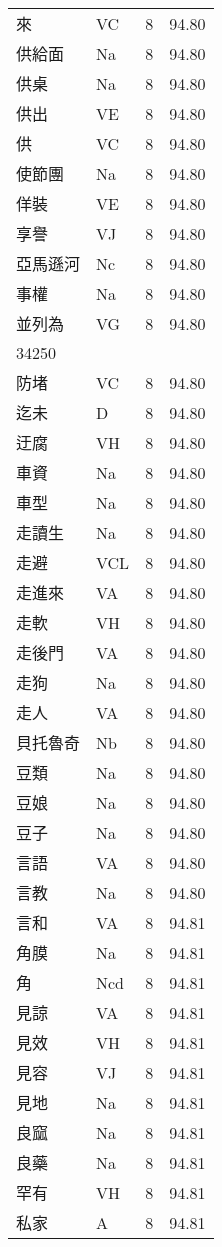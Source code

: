 \documentclass[twocolumn]{book}
\begin{document}
\begin{supertabular}{llrr}
來 & VC & 8 &  94.80\\
供給面 & Na & 8 &  94.80\\
供桌 & Na & 8 &  94.80\\
供出 & VE & 8 &  94.80\\
供 & VC & 8 &  94.80\\
使節團 & Na & 8 &  94.80\\
佯裝 & VE & 8 &  94.80\\
享譽 & VJ & 8 &  94.80\\
亞馬遜河 & Nc & 8 &  94.80\\
事權 & Na & 8 &  94.80\\
並列為 & VG & 8 &  94.80\\
34250\\
防堵 & VC & 8 &  94.80\\
迄未 & D & 8 &  94.80\\
迂腐 & VH & 8 &  94.80\\
車資 & Na & 8 &  94.80\\
車型 & Na & 8 &  94.80\\
走讀生 & Na & 8 &  94.80\\
走避 & VCL & 8 &  94.80\\
走進來 & VA & 8 &  94.80\\
走軟 & VH & 8 &  94.80\\
走後門 & VA & 8 &  94.80\\
走狗 & Na & 8 &  94.80\\
走人 & VA & 8 &  94.80\\
貝托魯奇 & Nb & 8 &  94.80\\
豆類 & Na & 8 &  94.80\\
豆娘 & Na & 8 &  94.80\\
豆子 & Na & 8 &  94.80\\
言語 & VA & 8 &  94.80\\
言教 & Na & 8 &  94.80\\
言和 & VA & 8 &  94.81\\
角膜 & Na & 8 &  94.81\\
角 & Ncd & 8 &  94.81\\
見諒 & VA & 8 &  94.81\\
見效 & VH & 8 &  94.81\\
見容 & VJ & 8 &  94.81\\
見地 & Na & 8 &  94.81\\
良窳 & Na & 8 &  94.81\\
良藥 & Na & 8 &  94.81\\
罕有 & VH & 8 &  94.81\\
私家 & A & 8 &  94.81\\

\end{supertabular}
\end{document}
